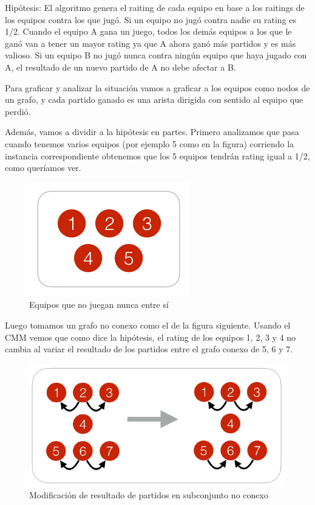 Hip\'otesis: El algoritmo genera el raiting de cada equipo en base a los raitings de los equipos contra los que jug\'o. Si un equipo no jug\'o contra nadie su rating es 1/2. Cuando el equipo A gana un juego, todos los dem\'as equipos a los que le gan\'o van a tener un mayor rating ya que A ahora gan\'o m\'as partidos y es m\'as valioso. Si un equipo B no jug\'o nunca contra ning\'un equipo que haya jugado con A, el resultado de un nuevo partido de A no debe afectar a B.

Para graficar y analizar la situaci\'on vamos a graficar a los equipos como nodos de un grafo, y cada partido ganado es una arista dirigida con sentido al equipo que perdi\'o.

Adem\'as, vamos a dividir a la hip\'otesis en partes. Primero analizamos que pasa cuando tenemos varios equipos (por ejemplo 5 como en la figura) corriendo la instancia correspondiente obtenemos que los 5 equipos tendr\'an rating igual a 1/2, como quer\'iamos ver.

\begin{figure}[h!]
  \begin{center}
	\includegraphics[scale=0.50]{imagenes/cualitative/fairness/fairness1.png}
	\caption{Equipos que no juegan nunca entre s\'i}
	\label{bChange}
  \end{center}
\end{figure}

Luego tomamos un grafo no conexo como el de la figura siguiente. Usando el CMM vemos que como dice la hip\'otesis, el rating de los equipos 1, 2, 3 y 4 no cambia al variar el resultado de los partidos entre el grafo conexo de 5, 6 y 7.

\begin{figure}[h!]
  \begin{center}
	\includegraphics[scale=0.50]{imagenes/cualitative/fairness/fairness2.png}
	\caption{Modificaci\'on de resultado de partidos en subconjunto no conexo}
	\label{bChange}
  \end{center}
\end{figure}

